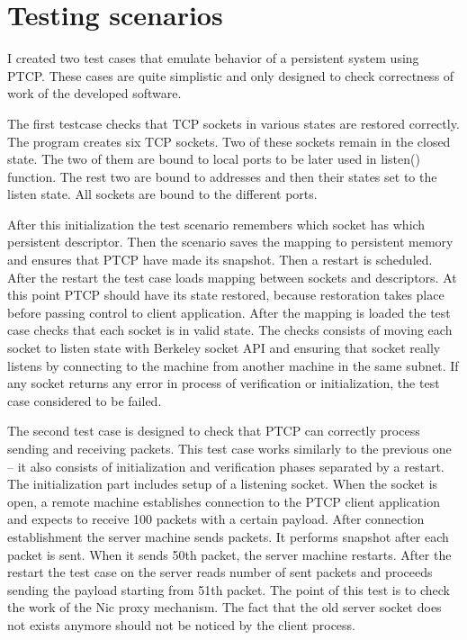 \section{Testing scenarios}

I created two test cases that emulate behavior of a persistent system using 
PTCP. These cases are quite simplistic and only designed to check correctness
of work of the developed software.

The first testcase checks that TCP sockets in various states are restored
correctly. The program creates six TCP sockets. Two of these sockets remain in
the closed state. The two of them are bound to local ports to be later used in
listen() function. The rest two are bound to addresses and then their states
set to the listen state. All sockets are bound to the different ports.

After this initialization the test scenario remembers which socket has which
persistent descriptor. Then the scenario saves the mapping to persistent memory
and ensures that PTCP have made its snapshot. Then a restart is scheduled.
After the restart the test case loads mapping between sockets and descriptors.
At this point PTCP should have its state restored, because restoration takes
place before passing control to client application. After the mapping is loaded
the test case checks that each socket is in valid state. The checks consists of
moving each socket to listen state with Berkeley socket API and ensuring that
socket really listens by connecting to the machine from another machine in the
same subnet. If any socket returns any error in process of verification or 
initialization, the test case considered to be failed.

The second test case is designed to check that PTCP can correctly process
sending and receiving packets. This test case works similarly to the previous
one -- it also consists of initialization and verification phases separated by
a restart. The initialization part includes setup of a listening socket. When
the socket is open, a remote machine establishes connection to the PTCP client
application and expects to receive 100 packets with a certain payload. After
connection establishment the server machine sends packets. It performs snapshot
after each packet is sent. When it sends 50th packet, the server machine 
restarts. After the restart the test case on the server reads number of sent
packets and proceeds sending the payload starting from 51th packet. The point
of this test is to check the work of the Nic proxy mechanism. The fact that
the old server socket does not exists anymore should not be noticed by the
client process. 

